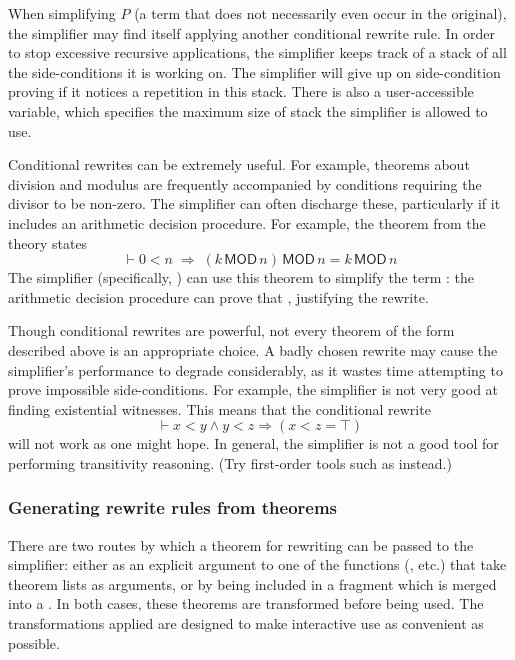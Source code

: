 When simplifying $P$ (a term that does not necessarily even occur in
the original), the simplifier may find itself applying another
conditional rewrite rule.  In order to stop excessive recursive
applications, the simplifier keeps track of a stack of all the
side-conditions it is working on.  The simplifier will give up on
side-condition proving if it notices a repetition in this stack.
There is also a user-accessible variable, 
which specifies the maximum size of stack the simplifier is allowed to
use.

Conditional rewrites can be extremely useful.  For example, theorems
about division and modulus are frequently accompanied by conditions
requiring the divisor to be non-zero.  The simplifier can often
discharge these, particularly if it includes an arithmetic decision
procedure.  For example, the theorem  from the theory
 states
\[
\vdash 0 < n \;\Rightarrow \; (k\,\textsf{MOD}\,n)\,\textsf{MOD}\,n = k
\,\textsf{MOD}\,n
\]
The simplifier (specifically, )
can use this theorem to simplify the term
: the arithmetic decision
procedure can prove that , justifying the rewrite.

Though conditional rewrites are powerful, not every theorem of the
form described above is an appropriate choice.  A badly chosen rewrite
may cause the simplifier's performance to degrade considerably, as it
wastes time attempting to prove impossible side-conditions.  For
example, the simplifier is not very good at finding existential
witnesses.  This means that the conditional rewrite \[
\vdash x < y \land y < z \Rightarrow (x < z = \top)
\]
will not work as one might hope.  In general, the simplifier is not a
good tool for performing transitivity reasoning.  (Try first-order
tools such as  instead.)

\subsubsection{Generating rewrite rules from theorems}
\label{sec:generating-rewrite-rules}

There are two routes by which a theorem for rewriting can be passed to
the simplifier: either as an explicit argument to one of the \ML{}
functions (,  etc.) that take theorem
lists as arguments, or by being included in a \simpset{} fragment
which is merged into a \simpset.  In both cases, these theorems are
transformed before being used.  The transformations applied are
designed to make interactive use as convenient as possible.

